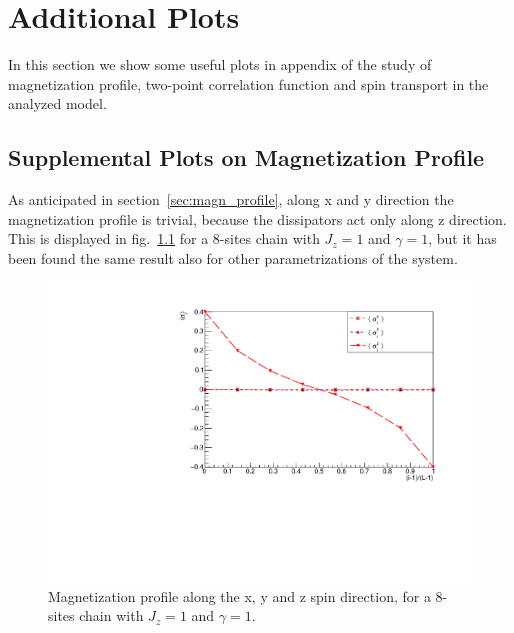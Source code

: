 \chapter{Additional Plots}
\label{appendix_supplemental}

In this section we show some useful plots in appendix of the study of magnetization profile, two-point correlation function and spin transport in the analyzed model.

\section{Supplemental Plots on Magnetization Profile}

As anticipated in section~\ref{sec:magn_profile}, along x and y direction the magnetization profile is trivial, because the dissipators act only along z direction. This is displayed in fig.~\ref{fig:comparisonSigmaXYZ} for a 8-sites chain with $J_z = 1$ and $\gamma = 1$, but it has been found the same result also for other parametrizations of the system.

\begin{figure}[H]
    \centering
    \captionsetup{width=1.\linewidth}
    \includegraphics[scale=0.6]{Figures/comparisonSigmaXYZ.pdf}
    \caption{Magnetization profile along the x, y and z spin direction, for a 8-sites chain with $J_z = 1$ and $\gamma = 1$.}
    \label{fig:comparisonSigmaXYZ}
\end{figure}

